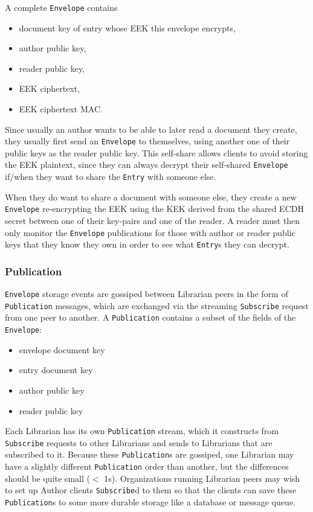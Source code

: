 \documentclass[10pt]{article}
\newcommand{\ttt}[1]{\texttt{#1}}
\def\Entry{\ttt{Entry}}
\def\Envelope{\ttt{Envelope}}
\def\Publication{\ttt{Publication}}
\begin{document}
A complete \Envelope{} contains
\begin{itemize}
	\item document key of entry whose EEK this envelope encrypts,
	\item author public key,
	\item reader public key,
	\item EEK ciphertext,
	\item EEK ciphertext MAC.
\end{itemize}
Since usually an author wants to be able to later read a document they create, they usually first send an \Envelope{} to themselves, using another one of their public keys as the reader public key. This self-share allows clients to avoid storing the EEK plaintext, since they can always decrypt their self-shared \Envelope{} if/when they want to share the \Entry{} with someone else.

When they do want to share a document with someone else, they create a new \Envelope{} re-encrypting the EEK using the KEK derived from the shared ECDH secret between one of their key-pairs and one of the reader. A reader must then only monitor the \Envelope{} publications for those with author or reader public keys that they know they own in order to see what \Entry{}s they can decrypt.

\subsubsection{Publication}

\Envelope{} storage events are gossiped between Librarian peers in the form of \Publication{} messages, which are exchanged via the streaming \ttt{Subscribe} request from one peer to another. A \Publication{} contains a subset of the fields of the \Envelope{}:
\begin{itemize}
	\item envelope document key
	\item entry document key
	\item author public key
	\item reader public key
\end{itemize}

Each Librarian has its own \Publication{} stream, which it constructs from \ttt{Subscribe} requests to other Librarians and sends to Librarians that are subscribed to it. Because these \texttt{Publication}s are gossiped, one Librarian may have a slightly different \Publication{} order than another, but the differences should be quite small ($<$ 1s). Organizations running Librarian peers may wish to set up Author clients \ttt{Subscribe}d to them so that the clients can save these \Publication{}s to some more durable storage like a database or message queue. 
\end{document}
